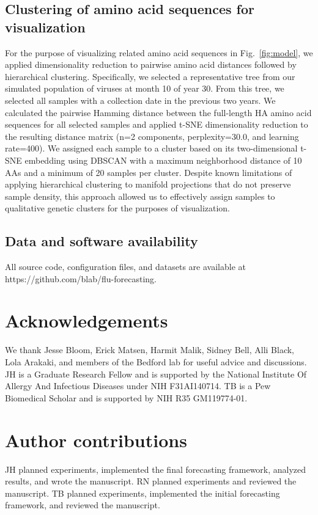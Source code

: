 \subsection*{Clustering of amino acid sequences for visualization}

For the purpose of visualizing related amino acid sequences in Fig.~\ref{fig:model}, we applied dimensionality reduction to pairwise amino acid distances followed by hierarchical clustering.
Specifically, we selected a representative tree from our simulated population of viruses at month 10 of year 30.
From this tree, we selected all samples with a collection date in the previous two years.
We calculated the pairwise Hamming distance between the full-length HA amino acid sequences for all selected samples and applied t-SNE dimensionality reduction \cite{vanDerMaaten2008} to the resulting distance matrix (n=2 components, perplexity=30.0, and learning rate=400).
We assigned each sample to a cluster based on its two-dimensional t-SNE embedding using DBSCAN \cite{Ester1996} with a maximum neighborhood distance of 10 AAs and a minimum of 20 samples per cluster.
Despite known limitations of applying hierarchical clustering to manifold projections that do not preserve sample density, this approach allowed us to effectively assign samples to qualitative genetic clusters for the purposes of visualization.

\subsection*{Data and software availability}

All source code, configuration files, and datasets are available at https://github.com/blab/flu-forecasting.

\section*{Acknowledgements}

We thank Jesse Bloom, Erick Matsen, Harmit Malik, Sidney Bell, Alli Black, Lola Arakaki, and members of the Bedford lab for useful advice and discussions.
JH is a Graduate Research Fellow and is supported by the National Institute Of Allergy And Infectious Diseases under NIH F31AI140714.
TB is a Pew Biomedical Scholar and is supported by NIH R35 GM119774-01.

\section*{Author contributions}

JH planned experiments, implemented the final forecasting framework, analyzed results, and wrote the manuscript.
RN planned experiments and reviewed the manuscript.
TB planned experiments, implemented the initial forecasting framework, and reviewed the manuscript.
